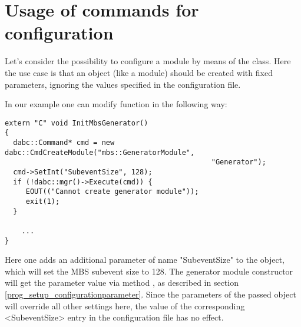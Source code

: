 \section{Usage of commands for configuration}
\label{prog_setup_configuration_commands}
Let's consider the possibility to configure a module by means of the  class.
Here the use case is that
an object (like a module) should be created with fixed parameters,
ignoring the values specified in the configuration file.

In our example one can modify  function in the following way:
\begin{small}
\begin{verbatim}
extern "C" void InitMbsGenerator() 
{
  dabc::Command* cmd = new dabc::CmdCreateModule("mbs::GeneratorModule", 
                                                 "Generator");
  cmd->SetInt("SubeventSize", 128);
  if (!dabc::mgr()->Execute(cmd)) {
     EOUT(("Cannot create generator module"));
     exit(1);
  }
    
    ...
}
\end{verbatim}
\end{small}

Here one adds an additional parameter of name "SubeventSize" to
the  object, 
which will set the MBS subevent size to 128. 
The generator module constructor will get the parameter value via method
, as described in section \ref{prog_setup_configurationparameter}.
Since the parameters of the passed  object will override all other settings here,
the value of the corresponding <SubeventSize> entry in the configuration file has no effect.

